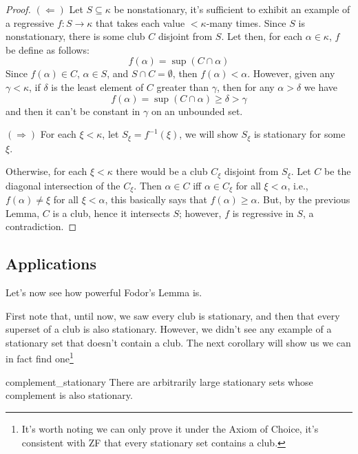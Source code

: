 \begin{proof}
    $(\Leftarrow)$ Let $S\subseteq\kappa$ be nonstationary, it's sufficient to exhibit an example of a regressive $f:S\to\kappa$ that takes each value $<\!\kappa$-many times. Since $S$ is nonstationary, there is some club $C$ disjoint from $S$. Let then, for each $\alpha\in\kappa$, $f$ be define as follows:
    $$f(\alpha)=\sup(C\cap\alpha)$$
    Since $f(\alpha)\in C$, $\alpha\in S$, and $S\cap C=\emptyset$, then $f(\alpha)<\alpha$. However, given any $\gamma<\kappa$, if $\delta$ is the least element of $C$ greater than $\gamma$, then for any $\alpha>\delta$ we have
    $$f(\alpha)=\sup(C\cap\alpha)\geq \delta>\gamma$$
    and then it can't be constant in $\gamma$ on an unbounded set.

    $(\Rightarrow)$ For each $\xi<\kappa$, let $S_\xi=f^{-1}(\xi)$, we will show $S_\xi$ is stationary for some $\xi$.

    Otherwise, for each $\xi<\kappa$ there would be a club $C_\xi$ disjoint from $S_\xi$. Let $C$ be the diagonal intersection of the $C_\xi$. Then $\alpha\in C$ iff $\alpha\in C_\xi$ for all $\xi<\alpha$, i.e., $f(\alpha)\neq\xi$ for all $\xi<\alpha$, this basically says that $f(\alpha)\geq\alpha$. But, by the previous Lemma, $C$ is a club, hence it intersects $S$; however, $f$ is regressive in $S$, a contradiction.
\end{proof}

\subsection{Applications}

Let's now see how powerful Fodor's Lemma is.

First note that, until now, we saw every club is stationary, and then that every superset of a club is also stationary. However, we didn't see any example of a stationary set that doesn't contain a club. The next corollary will show us we can in fact find one\footnote{It's worth noting we can only prove it under the Axiom of Choice, it's consistent with ZF that every stationary set contains a club.}

\begin{corollary}{}{complement_stationary}
    There are arbitrarily large stationary sets whose complement is also stationary.
\end{corollary}

